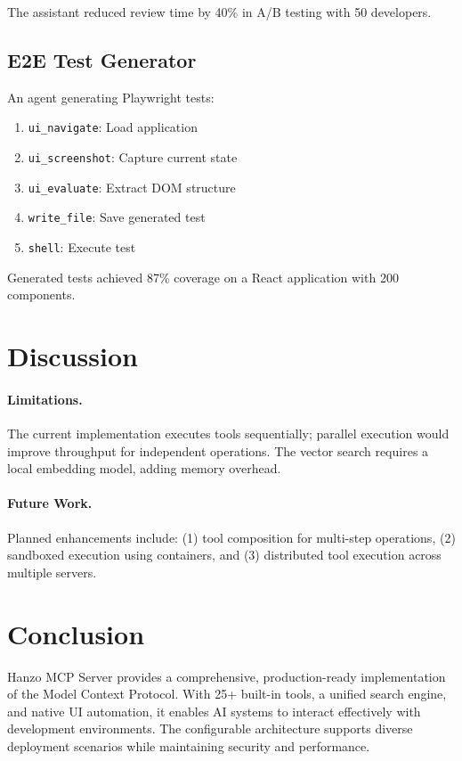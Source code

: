 \documentclass[11pt,twocolumn]{article}
\begin{document}
The assistant reduced review time by 40\% in A/B testing with 50 developers.

\subsection{E2E Test Generator}

An agent generating Playwright tests:
\begin{enumerate}
    \item \texttt{ui\_navigate}: Load application
    \item \texttt{ui\_screenshot}: Capture current state
    \item \texttt{ui\_evaluate}: Extract DOM structure
    \item \texttt{write\_file}: Save generated test
    \item \texttt{shell}: Execute test
\end{enumerate}

Generated tests achieved 87\% coverage on a React application with 200 components.

\section{Discussion}

\paragraph{Limitations.} The current implementation executes tools sequentially; parallel execution would improve throughput for independent operations. The vector search requires a local embedding model, adding memory overhead.

\paragraph{Future Work.} Planned enhancements include: (1) tool composition for multi-step operations, (2) sandboxed execution using containers, and (3) distributed tool execution across multiple servers.

\section{Conclusion}

Hanzo MCP Server provides a comprehensive, production-ready implementation of the Model Context Protocol. With 25+ built-in tools, a unified search engine, and native UI automation, it enables AI systems to interact effectively with development environments. The configurable architecture supports diverse deployment scenarios while maintaining security and performance.
\end{document}
